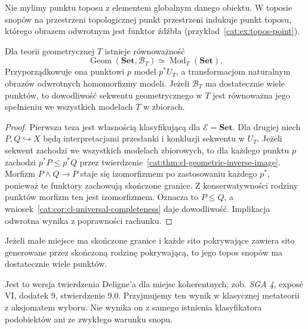 Nie mylimy punktu toposu z elementem globalnym danego obiektu. W toposie snopów na przestrzeni topologicznej punkt przestrzeni indukuje punkt toposu, którego obrazem odwrotnym jest funktor źdźbła (przykład~\ref{cat:ex:topos-point}).

\begin{stwierdzenie}\label{cat:prop:cl-points-models}
Dla teorii geometrycznej $T$ istnieje równoważność
\[
 \operatorname{Geom}(\mathbf{Set},\mathcal B_T)
 \simeq\operatorname{Mod}_T(\mathbf{Set}).
\]
Przyporządkowuje ona punktowi $p$ model $p^*U_T$, a transformacjom naturalnym obrazów odwrotnych homomorfizmy modeli. Jeżeli $\mathcal B_T$ ma dostatecznie wiele punktów, to dowodliwość sekwentu geometrycznego w $T$ jest równoważna jego spełnieniu we wszystkich modelach $T$ w zbiorach.
\end{stwierdzenie}
\begin{proof}
Pierwsza teza jest własnością klasyfikującą dla $\mathcal E=\mathbf{Set}$. Dla drugiej niech $P,Q\hookrightarrow X$ będą interpretacjami przesłanki i konkluzji sekwentu w $U_T$. Jeżeli sekwent zachodzi we wszystkich modelach zbiorowych, to dla każdego punktu $p$ zachodzi $p^*P\leq p^*Q$ przez twierdzenie~\ref{cat:thm:cl-geometric-inverse-image}. Morfizm $P\wedge Q\to P$ staje się izomorfizmem po zastosowaniu każdego $p^*$, ponieważ te funktory zachowują skończone granice. Z konserwatywności rodziny punktów morfizm ten jest izomorfizmem. Oznacza to $P\leq Q$, a wniosek~\ref{cat:cor:cl-universal-completeness} daje dowodliwość. Implikacja odwrotna wynika z poprawności rachunku.
\end{proof}

\begin{twierdzenie}\label{cat:thm:cl-deligne}
Jeżeli małe miejsce ma skończone granice i każde sito pokrywające zawiera sito generowane przez skończoną rodzinę pokrywającą, to jego topos snopów ma dostatecznie wiele punktów.
\end{twierdzenie}

Jest to wersja twierdzenia Deligne'a dla miejsc koherentnych; zob. \emph{SGA 4}, exposé VI, dodatek 9, stwierdzenie 9.0. Przyjmujemy ten wynik w klasycznej metateorii z aksjomatem wyboru. Nie wynika on z samego istnienia klasyfikatora podobiektów ani ze zwykłego warunku snopu.

